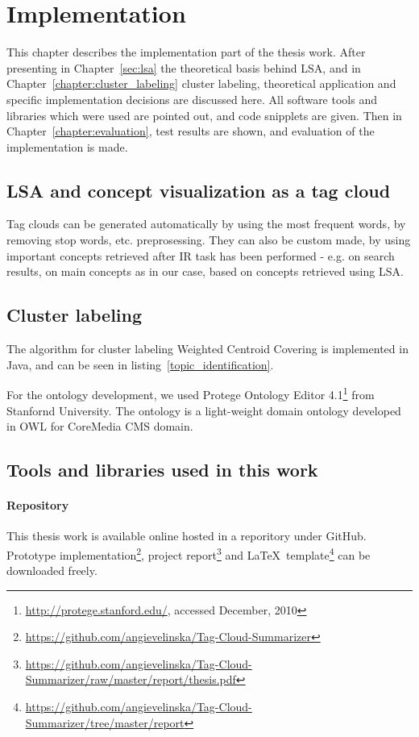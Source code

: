 \chapter{Implementation}
\label{sec:implementation}

This chapter describes the implementation part of the thesis work. After presenting in Chapter~\ref{sec:lsa} the theoretical basis behind \gls{LSA}, and in Chapter~\ref{chapter:cluster_labeling} cluster labeling, theoretical application and specific implementation decisions are discussed here. All software tools and libraries which were used are pointed out, and code snipplets are given. Then in Chapter~\ref{chapter:evaluation}, test results are shown, and evaluation of the implementation is made. \\


\section{LSA and concept visualization as a tag cloud}
Tag clouds can be generated automatically by using the most frequent words, by removing stop words, etc. preprosessing. They can also be custom made, by using important concepts retrieved after \gls{IR} task has been performed - e.g. on search results, on main concepts as in our case, based on concepts retrieved using \gls{LSA}. \\


\section{Cluster labeling}
The algorithm for cluster labeling Weighted Centroid Covering is implemented in Java, and can be seen in listing~\ref{topic_identification}.

For the ontology development, we used Protege Ontology Editor 4.1\footnote{\url{http://protege.stanford.edu/}, accessed December, 2010} from Stanfornd University. The ontology is a light-weight domain ontology developed in OWL for CoreMedia \gls{CMS} domain. \\


\section{Tools and libraries used in this work}
\label{sec:implementation:tools_used}

\subsubsection{Repository}
This thesis work is available online hosted in a reporitory under GitHub. Prototype implementation\footnote{\url{https://github.com/angievelinska/Tag-Cloud-Summarizer}}, project report\footnote{\url{https://github.com/angievelinska/Tag-Cloud-Summarizer/raw/master/report/thesis.pdf}} and \LaTeX~template\footnote{\url{https://github.com/angievelinska/Tag-Cloud-Summarizer/tree/master/report}} can be downloaded freely. \\

